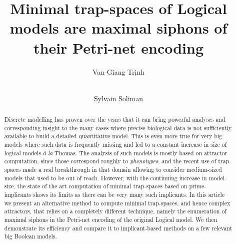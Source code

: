 \documentclass[runningheads]{llncs}
\begin{document}
%
\title{Minimal trap-spaces of Logical models are maximal siphons of their Petri-net encoding}
\author{Van-Giang Trịnh \and \\
  Sylvain Soliman}


\maketitle

\begin{abstract}

  Discrete modelling has proven over the years that it can bring powerful analyses and corresponding insight to the many cases where precise biological data is not sufficiently available to build a detailed quantitative model.
  This is even more true for very big models where such data is frequently missing and led to a constant increase in size of logical models \emph{à la} Thomas.
  The analysis of such models is mostly based on attractor computation, since those correspond roughly to \emph{phenotypes}, and the recent use of trap-spaces made a real breakthrough in that domain allowing to consider medium-sized models that used to be out of reach.
  However, with the continuing increase in model-size, the state of the art computation of minimal trap-spaces based on prime-implicants shows its limits as there can be very many such implicants.
  In this article we present an alternative method to compute minimal trap-spaces, and hence complex attractors, that relies on a completely different technique, namely the enumeration of maximal siphons in the Petri-net encoding of the original Logical model.
  We then demonstrate its efficiency and compare it to implicant-based methods on a few relevant big Boolean models.

\end{abstract}
\end{document}
